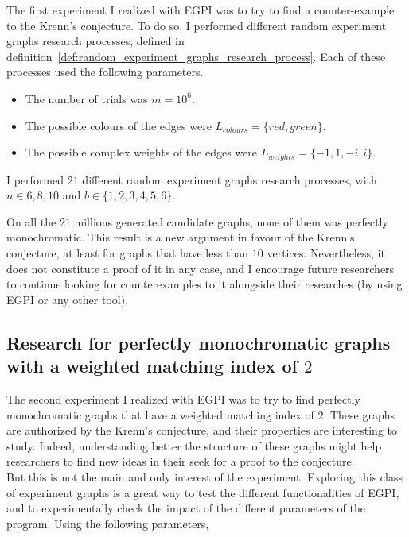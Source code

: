 The first experiment I realized with EGPI was to try to find a counter-example to the Krenn's conjecture.
To do so, I performed different random experiment graphs research processes, defined in definition~\ref{def:random_experiment_graphs_research_process}.
Each of these processes used the following parameters.

\begin{itemize}
    \item The number of trials was $m = 10^6$.
    \item The possible colours of the edges were $L_{colours} = \{red, green\}$.
    \item The possible complex weights of the edges were $L_{weights} = \{-1, 1, -i, i\}$.
\end{itemize}

I performed $21$ different random experiment graphs research processes, with $n \in {6, 8, 10}$ and $b \in \{1, 2, 3, 4, 5, 6\}$.

On all the $21$ millions generated candidate graphs, none of them was perfectly monochromatic.
This result is a new argument in favour of the Krenn's conjecture, at least for graphs that have less than $10$ vertices.
Nevertheless, it does not constitute a proof of it in any case, and I encourage future researchers to continue looking for counterexamples to it alongside their researches (by using EGPI or any other tool). \\


\subsection{Research for perfectly monochromatic graphs with a weighted matching index of $2$}
\label{subsec:research-for-graphs-with-c-of-2}

The second experiment I realized with EGPI was to try to find perfectly monochromatic graphs that have a weighted matching index of $2$.
These graphs are authorized by the Krenn's conjecture, and their properties are interesting to study.
Indeed, understanding better the structure of these graphs might help researchers to find new ideas in their seek for a proof to the conjecture.\\

But this is not the main and only interest of the experiment.
Exploring this class of experiment graphs is a great way to test the different functionalities of EGPI, and to experimentally check the impact of the different parameters of the program.
Using the following parameters,

